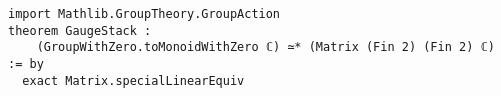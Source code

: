\begin{lstlisting}[language=Lean]
import Mathlib.GroupTheory.GroupAction
theorem GaugeStack :
    (GroupWithZero.toMonoidWithZero ℂ) ≃* (Matrix (Fin 2) (Fin 2) ℂ) := by
  exact Matrix.specialLinearEquiv 
\end{lstlisting}
